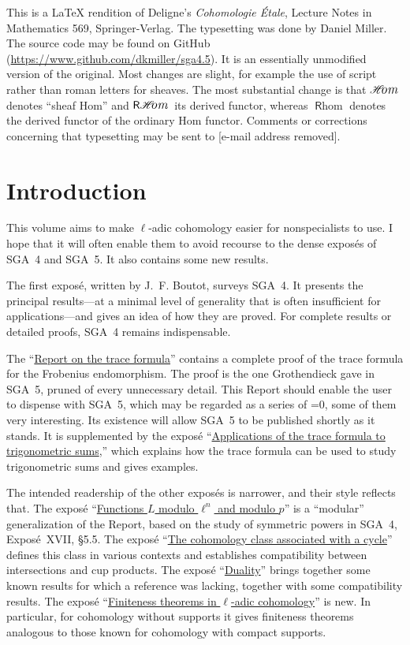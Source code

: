 \documentclass[oneside]{book}
\makeatletter
\providecommand\calligra{\itshape}}
\DeclareMathOperator{\Hom}{\mathscr{H}\text{\kern -3pt {\calligra\large om}}\,} %
\DeclareMathOperator{\rHom}{\mathsf{R}\vspace{-1pt}\mathscr{H}\text{\kern -3pt {\calligra\large om}}\,}
\DeclareMathOperator{\rhom}{\mathsf{R}\hom}
\theoremstyle{sga-source}
\theoremstyle{sga-source-dash}
\theoremstyle{sga-source-dotdash}
\theoremstyle{sga-source-number-note-dash}
\theoremstyle{sga-source-note-number-dotdash}
\theoremstyle{sga-source-example-dotdash}
\theoremstyle{sga-source-inline-number}
\theoremstyle{sga-source-bare-number}
\theoremstyle{sga-source}
\providecommand\EditionMode{0}
\providecommand\EditionLanguage{en}
\DeclareRobustCommand{\EditionVariantMark}[2]{%
  \ifx\relax#1\relax\else
    \ifmmode
      \hbox{\raisebox{0.7ex}{\normalfont\scriptsize\color{EditionAppColor}%
        \hyperlink{apparatus:#1}{\EditionShortOccurrence{#1}}}}%
    \else
      \textsuperscript{\normalfont\scriptsize\color{EditionAppColor}%
        \hyperlink{apparatus:#1}{\EditionShortOccurrence{#1}}}%
    \fi
  \fi}
\def\EditionShortOccurrence#1{\expandafter\EditionShortOccurrenceAux#1\@nil}
\def\EditionShortOccurrenceAux#1-#2\@nil{\number#2\relax}
\DeclareRobustCommand{\var}[4][]{%
  \ifnum\EditionMode=0\relax
    \expandafter\@firstoftwo
  \else
    \expandafter\@secondoftwo
  \fi
  {#2}{\ifnum\EditionMode=1\relax\EditionVariantMark{#1}{#4}\fi#3}}
\providecommand\CurrentPrintPage{}
\DeclareRobustCommand{\PrintPage}[1]{%
  \gdef\CurrentPrintPage{#1}%
  \hypertarget{printpage:\EditionLanguage:#1}{}%
  \marginnote{\normalfont\sffamily\scriptsize\color{black!65}%
    \ifnum\EditionMode=2\relax#1\else[p.~#1]\fi}}
\DeclareRobustCommand{\MathPage}[1]{\PrintPage{#1}}
\def\EditionPDFVar[#1]#2#3#4{\ifnum\EditionMode=0\relax\expandafter\@firstoftwo\else\expandafter\@secondoftwo\fi{#2}{#3}}
\let\var\EditionPDFVar
\def\PrintPage#1{}\def\MathPage#1{}%
\def\EditionVariantMark#1#2{}}
\makeatother
\begin{document}
This is a \LaTeX{} rendition of Deligne's \emph{Cohomologie \'Etale},
Lecture Notes in Mathematics 569, Springer-Verlag. The typesetting was done by
Daniel Miller. The source code may be found on GitHub
(\url{https://www.github.com/dkmiller/sga4.5}). It is an essentially
unmodified version of the original. Most changes are slight, for example the
use of script rather than roman letters for sheaves. The most substantial
change is that $\Hom$ denotes ``sheaf Hom'' and $\rHom$ its derived functor,
whereas $\rhom$ denotes the derived functor of the ordinary Hom functor.
Comments or corrections concerning that typesetting may be sent to
[e-mail address removed].


\clearpage\fi
\clearpage{}\hypersetup{pageanchor=true}


\chapter*{Introduction}\PrintPage{III}

This volume aims to make $\ell$-adic cohomology easier for nonspecialists to
use. I hope that it will often enable them to avoid recourse to the dense
expos\'es of SGA~4 and SGA~5. It also contains some new results.

The first expos\'e, written by J.~F. Boutot, surveys SGA~4. It presents the
principal results---at a minimal level of generality that is often
insufficient for applications---and gives an idea of how they are proved. For
complete results or detailed proofs, SGA~4 remains indispensable.

The ``\hyperref[II]{Report on the trace formula}'' contains a complete proof of the trace formula for the
Frobenius endomorphism. The proof is the one Grothendieck gave in SGA~5,
pruned of every unnecessary detail. This Report should enable the user to
dispense with SGA~5, which may be regarded as a series of \var[EN-0001]{digression}{digressions}{SGA45-CORR-0001}, some of
them very interesting. Its existence will allow SGA~5 to be published shortly
as it stands. It is supplemented by the expos\'e ``\hyperref[VI]{Applications of the trace formula to trigonometric sums},'' which
explains how the trace formula can be used to study trigonometric sums and
gives examples.

The intended readership of the other expos\'es is narrower, and their style
reflects that. The expos\'e ``\hyperref[III]{Functions $L$ modulo $\ell^n$ and modulo $p$}'' is a ``modular'' generalization
of the Report, based on the study of symmetric powers in SGA~4, Expos\'e~XVII,
\S5.5. The expos\'e ``\hyperref[IV]{The cohomology class associated with a cycle}'' defines this class in various contexts
and establishes compatibility between intersections and cup products. The
expos\'e ``\hyperref[V]{Duality}'' brings together some known results for which a
reference was lacking, together with some compatibility results. The expos\'e
``\hyperref[VII]{Finiteness theorems in $\ell$-adic cohomology}'' is new. In particular, for cohomology without supports it
gives finiteness theorems analogous to those known for cohomology with compact
supports.
\end{document}
